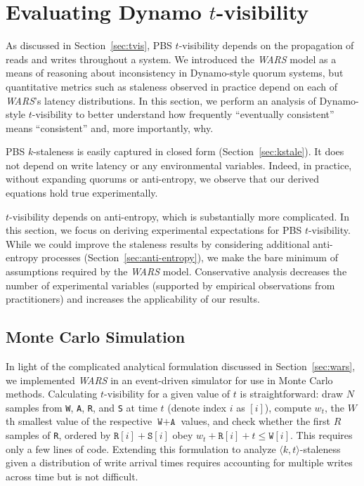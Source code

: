 \documentclass{vldb}
\newcommand{\sectionskip}{-0em}
\newcommand{\subsectionskip}{-0em}
\begin{document}
\vspace{\sectionskip}\section{Evaluating Dynamo {\large $t$}-visibility}
\label{sec:dynamoeval}

As discussed in Section~\ref{sec:tvis}, PBS $t$-visibility depends on
the propagation of reads and writes throughout a system.  We
introduced the \textit{WARS} model as a means of reasoning about
inconsistency in Dynamo-style quorum systems, but quantitative metrics
such as staleness observed in practice depend on each of
\textit{WARS}'s latency distributions.  In this section, we perform an
analysis of Dynamo-style $t$-visibility to better understand how
frequently ``eventually consistent'' means ``consistent'' and, more
importantly, why.

PBS $k$-staleness is easily captured in closed form
(Section~\ref{sec:kstale}).  It does not depend on write latency or
any environmental variables.  Indeed, in practice, without expanding
quorums or anti-entropy, we observe that our derived equations hold
true experimentally.

$t$-visibility depends on anti-entropy, which is substantially more
complicated.  In this section, we focus on deriving experimental
expectations for PBS $t$-visibility.  While we could improve the
staleness results by considering additional anti-entropy processes
(Section~\ref{sec:anti-entropy}), we make the bare minimum of
assumptions required by the \textit{WARS} model.  Conservative
analysis decreases the number of experimental variables (supported by
empirical observations from practitioners) and increases the
applicability of our results.

\vspace{\subsectionskip}\subsection{Monte Carlo Simulation}
\label{sec:mcsim}

In light of the complicated analytical formulation discussed in
Section~\ref{sec:wars}, we implemented \textit{WARS} in an
event-driven simulator for use in Monte Carlo methods.  Calculating
$t$-visibility for a given value of $t$ is straightforward: draw $N$
samples from \texttt{W}, \texttt{A}, \texttt{R}, and \texttt{S} at
time $t$ (denote index $i$ as $[i]$), compute $w_t$, the $W$th
smallest value of the respective $\texttt{W}+\texttt{A}$ values, and
check whether the first $R$ samples of \texttt{R}, ordered by
$\texttt{R}[i]+\texttt{S}[i]$ obey $w_t+\texttt{R}[i] + t\leq
\texttt{W}[i]$.  This requires only a few lines of code.  Extending
this formulation to analyze $\langle k, t \rangle$-staleness given a
distribution of write arrival times requires accounting for multiple
writes across time but is not difficult.
\end{document}
